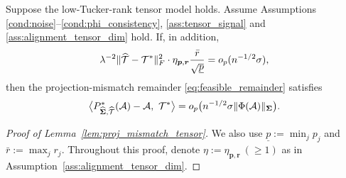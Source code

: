 \documentclass[authoryear,preprint,review,12pt]{elsarticle}
\begin{document}
{  
	\begin{Lemma}
		\label{lem:proj_mismatch_tensor}
		Suppose the low-Tucker-rank tensor model holds.
		Assume Assumptions \ref{cond:noise}--\ref{cond:phi_consistency}, \ref{ass:tensor_signal} and \ref{ass:alignment_tensor_dim} hold.
		If, in addition,
		\[
		\lambda^{-2}\|\widehat{\mathcal{T}}-\mathcal{T}^\ast\|_F^2\cdot\eta_{\bm p,\bm r} \frac{\bar r}{\sqrt{\underline p}}
		=
		o_p(n^{-1/2}\sigma),
		\]
		then the projection-mismatch remainder \eqref{eq:feasible_remainder} satisfies
		\[
		\big\langle P_{\widehat{\mathbf{ \Sigma}},\widehat{\mathcal{T}}}^\ast(\mathcal{A})-\mathcal{A},\ \mathcal{T}^\ast\big\rangle 
		=
		o_p \bigl(n^{-1/2}\sigma\|\Phi(\mathcal{A})\|_{\mathbf{ \Sigma}}\bigr).
		\]
	\end{Lemma}
}
{  
	\begin{proof}[Proof of Lemma~\ref{lem:proj_mismatch_tensor}]
		We also use $\underline p:=\min_j p_j$ and $\bar r:=\max_j r_j$. Throughout this proof, denote
		$\eta:=\eta_{\bm p,\bm r}\ (\ge 1)$ 	as in Assumption~\ref{ass:alignment_tensor_dim}.
		
		

\end{proof}}
\end{document}
